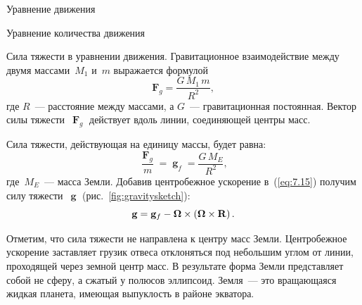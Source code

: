 \begin{chapter}{Уравнение движения}
\begin{section}{Уравнение количества движения}
\begin{paragraph}{Сила тяжести в уравнении движения.}
Гравитационное взаимодействие между двумя массами~$M_1$ и~$m$ выражается
формулой
\begin{displaymath}
\textbf{F}_g = \frac{G\,M_1\, m}{R^2},
\end{displaymath}
где $R$~--- расстояние между массами, а $G$~--- гравитационная
постоянная. Вектор силы тяжести~$\mbfF_g$ действует вдоль линии,
соединяющей центры масс. 
%

Сила тяжести, действующая на единицу массы, будет равна:
\begin{equation}\label{eq:7.15}
\frac{\mbfF_g}{m} = \mbfg_f =\frac{G\,M_E}{R^2},
\end{equation}
где~$M_E$~--- масса Земли. Добавив центробежное ускорение в~(\ref{eq:7.15})
получим силу тяжести~$\mbfg$ (рис.~\ref{fig:gravitysketch}):
\begin{equation}
\mathbf{g} = \mathbf{g}_f - \boldsymbol{\Omega} \times \left(\boldsymbol{\Omega} \times \mathbf{R} \right).
\end{equation}
%

Отметим, что сила тяжести не направлена к центру масс
Земли. Центробежное ускорение заставляет грузик отвеса отклоняться под
небольшим углом от линии, проходящей через земной центр масс. 
В результате форма Земли представляет собой не сферу, а сжатый у полюсов 
эллипсоид. Земля~--- это вращающаяся жидкая планета, имеющая выпуклость 
в районе экватора.
%
\end{paragraph}


\end{section}
\end{chapter}
